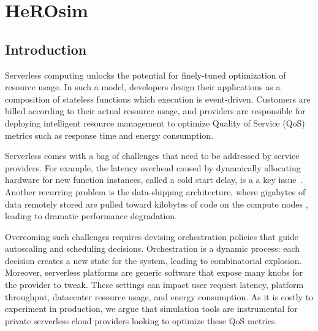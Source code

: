 \chapter{HeROsim}

\section{Introduction}
\label{section:herosim-introduction}

Serverless computing unlocks the potential for finely-tuned optimization of resource usage. In such a model, developers design their applications as a composition of stateless functions which execution is event-driven. %
Customers are billed according to their actual resource usage, and providers are responsible for deploying intelligent resource management to optimize Quality of Service (QoS) metrics such as response time and energy consumption.%




Serverless comes with a bag of challenges that need to be addressed by service providers. For example, the latency overhead caused by dynamically allocating hardware for new function instances, called a cold start delay, is a a key issue~\cite{Lannurien2023}. Another recurring problem is the data-shipping architecture, where gigabytes of data remotely stored are pulled toward kilobytes of code on the compute nodes%
, leading to dramatic performance degradation.

Overcoming such challenges requires devising orchestration policies that guide autoscaling and scheduling decisions.
Orchestration is a dynamic process: each decision creates a new state for the system, leading to combinatorial explosion. Moreover, serverless platforms are generic software that expose many knobs for the provider to tweak. These settings can impact user request latency, platform throughput, datacenter resource usage, and energy consumption. As it is costly to experiment in production, we argue that simulation tools are instrumental for private serverless cloud providers looking to optimize these QoS metrics.%

